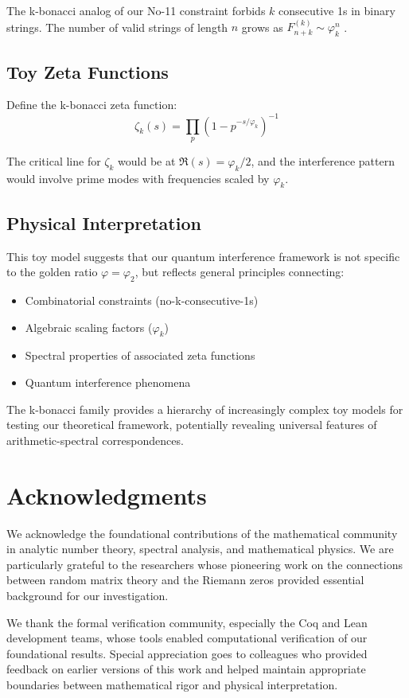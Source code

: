 \documentclass[12pt]{article}
\theoremstyle{plain}
\theoremstyle{definition}
\begin{document}
The k-bonacci analog of our No-11 constraint forbids $k$ consecutive 1s in binary strings. The number of valid strings of length $n$ grows as $F_{n+k}^{(k)} \sim \varphi_k^n$ \cite{dekking2023}.

\subsection{Toy Zeta Functions}

Define the k-bonacci zeta function:
$$
\zeta_k(s) = \prod_{p} \left(1 - p^{-s/\varphi_k}\right)^{-1}
$$

The critical line for $\zeta_k$ would be at $\Re(s) = \varphi_k/2$, and the interference pattern would involve prime modes with frequencies scaled by $\varphi_k$.

\subsection{Physical Interpretation}

This toy model suggests that our quantum interference framework is not specific to the golden ratio $\varphi = \varphi_2$, but reflects general principles connecting:
\begin{itemize}
\item Combinatorial constraints (no-k-consecutive-1s)
\item Algebraic scaling factors ($\varphi_k$)
\item Spectral properties of associated zeta functions
\item Quantum interference phenomena
\end{itemize}

The k-bonacci family provides a hierarchy of increasingly complex toy models for testing our theoretical framework, potentially revealing universal features of arithmetic-spectral correspondences.

\section*{Acknowledgments}

We acknowledge the foundational contributions of the mathematical community in analytic number theory, spectral analysis, and mathematical physics. We are particularly grateful to the researchers whose pioneering work on the connections between random matrix theory and the Riemann zeros provided essential background for our investigation.

We thank the formal verification community, especially the Coq and Lean development teams, whose tools enabled computational verification of our foundational results. Special appreciation goes to colleagues who provided feedback on earlier versions of this work and helped maintain appropriate boundaries between mathematical rigor and physical interpretation.
\end{document}
